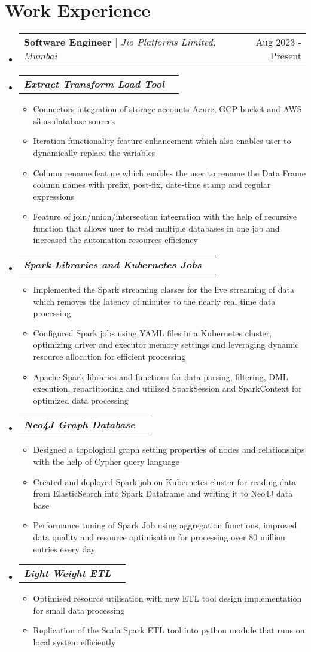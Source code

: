 \documentclass[letterpaper,11pt]{article}
\makeatletter
\newcommand{\resumeItem}[1]{
  \item\small{
    {#1 \vspace{-2pt}}
  }
}
\newcommand{\resumeSubSubheading}[2]{
    \item
    \begin{tabular*}{0.97\textwidth}{l@{\extracolsep{\fill}}r}
      \textit{\small#1} & \textit{\small #2} \\
    \end{tabular*}\vspace{-7pt}
}
\newcommand{\resumeProjectHeading}[2]{
    \item
    \begin{tabular*}{0.97\textwidth}{l@{\extracolsep{\fill}}r}
      \small#1 & #2 \\
    \end{tabular*}\vspace{-7pt}
}
\newcommand{\resumeSubHeadingListStart}{\begin{itemize}[leftmargin=0.15in, label={}]}
\newcommand{\resumeSubHeadingListEnd}{\end{itemize}}
\newcommand{\resumeItemListStart}{\begin{itemize}}
\newcommand{\resumeItemListEnd}{\end{itemize}\vspace{-5pt}}
\makeatother
\begin{document}
\section{Work Experience}
    \resumeSubHeadingListStart
    \resumeProjectHeading
          {\textbf{Software Engineer} $|$ \emph{Jio Platforms Limited, Mumbai}}{Aug 2023 - Present}
        \resumeSubSubheading{\textbf{ Extract Transform Load Tool}}{}
          \resumeItemListStart
            \resumeItem{Connectors integration of storage accounts Azure, GCP bucket and AWS s3 as database sources}
            \resumeItem{Iteration functionality feature enhancement which also enables user to dynamically replace the variables}
            \resumeItem{Column rename feature which enables the user to rename the Data Frame column names with prefix, post-fix, date-time stamp and regular expressions}
            \resumeItem{Feature of join/union/intersection integration with the help of recursive function that allows user to read multiple databases in one job and increased the automation resources efficiency}
          \resumeItemListEnd
        \resumeSubSubheading{\textbf{ Spark Libraries and Kubernetes Jobs}}{}
          \resumeItemListStart
           \resumeItem{Implemented the Spark streaming classes for the live streaming of data which removes the latency of minutes to the nearly real time data processing}
           \resumeItem{Configured Spark jobs using YAML files in a Kubernetes cluster, optimizing driver and executor memory settings and leveraging dynamic resource allocation for efficient processing}
            \resumeItem{Apache Spark libraries and functions for data parsing, filtering, DML execution, repartitioning and utilized SparkSession and SparkContext for optimized data processing}
          \resumeItemListEnd 
        \resumeSubSubheading{\textbf{ Neo4J Graph Database}}{}
          \resumeItemListStart
           \resumeItem{Designed a topological graph setting properties of nodes and relationships with the help of Cypher query language}
           \resumeItem{ Created and deployed Spark job on Kubernetes cluster for reading data from ElasticSearch into Spark Dataframe and writing it to Neo4J data base}
            \resumeItem{Performance tuning of Spark Job using aggregation functions, improved data quality and resource optimisation for processing over 80 million entries every day}
          \resumeItemListEnd
        \resumeSubSubheading{\textbf{ Light Weight ETL}}{}
          \resumeItemListStart
           \resumeItem{Optimised resource utilisation with new ETL tool design implementation  for small data processing}
           \resumeItem{Replication of the Scala Spark ETL tool into python module that runs on local system  efficiently}
          \resumeItemListEnd
    \resumeSubHeadingListEnd
\end{document}
